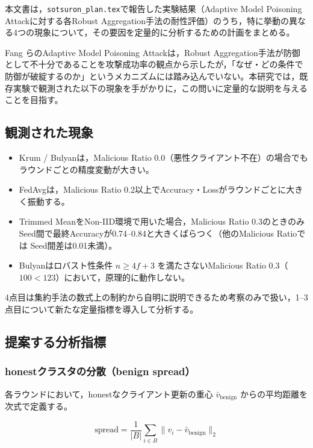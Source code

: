 \documentclass[a4j, twocolumn, dvipdfmx]{jsarticle}  %
\begin{document}
本文書は，\texttt{sotsuron\_plan.tex}で報告した実験結果（Adaptive Model Poisoning Attackに対する各Robust Aggregation手法の耐性評価）のうち，特に挙動の異なる4つの現象について，その要因を定量的に分析するための計画をまとめる。

Fang ら\cite{fang2020local}のAdaptive Model Poisoning Attackは，Robust Aggregation手法が防御として不十分であることを攻撃成功率の観点から示したが，「なぜ・どの条件で防御が破綻するのか」というメカニズムには踏み込んでいない。本研究では，既存実験で観測された以下の現象を手がかりに，この問いに定量的な説明を与えることを目指す。

\subsection{観測された現象}

\begin{itemize}
  \item Krum / Bulyanは，Malicious Ratio 0.0（悪性クライアント不在）の場合でもラウンドごとの精度変動が大きい。
  \item FedAvgは，Malicious Ratio 0.2以上でAccuracy・Lossがラウンドごとに大きく振動する。
  \item Trimmed MeanをNon-IID環境で用いた場合，Malicious Ratio 0.3のときのみSeed間で最終Accuracyが0.74--0.84と大きくばらつく（他のMalicious Ratioでは Seed間差は0.01未満）。
  \item Bulyanはロバスト性条件 $n \geq 4f+3$ を満たさないMalicious Ratio 0.3（$100 < 123$）において，原理的に動作しない。
\end{itemize}

4点目は集約手法の数式上の制約から自明に説明できるため考察のみで扱い，1--3点目について新たな定量指標を導入して分析する。

\subsection{提案する分析指標}

\subsubsection{honestクラスタの分散（benign spread）}

各ラウンドにおいて，honestなクライアント更新の重心 $\bar{v}_{\text{benign}}$ からの平均距離を次式で定義する。

\begin{equation}
\text{spread} = \frac{1}{|B|}\sum_{i \in B} \|v_i - \bar{v}_{\text{benign}}\|_2
\end{equation}
\end{document}
